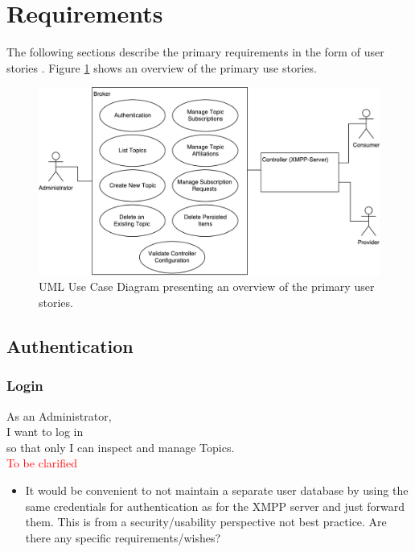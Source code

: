 
\section{Requirements}\label{sec:requirements}

The following sections describe the primary requirements in the form of user stories \cite{agile-alliance-user-stories}.
Figure \ref{fig:requirements-overview} shows an overview of the primary use stories.

\begin{figure}[h]
    \centering
    \includegraphics[width=1\linewidth]{resources/requirements_overview}
    \caption{UML Use Case Diagram presenting an overview of the primary user stories.}
    \label{fig:requirements-overview}
\end{figure}



\subsection{Authentication}
\subsubsection{Login}

As an Administrator,\\
I want to log in\\
so that only I can inspect and manage Topics.\\

\noindent\textcolor{red}{To be clarified}

\begin{itemize}
    \item It would be convenient to not maintain a separate user database by using the same credentials for authentication
            as for the XMPP server and just forward them. This is from a security/usability perspective not best practice.
            Are there any specific requirements/wishes?
\end{itemize}


